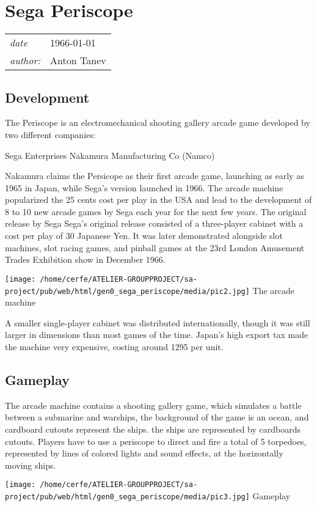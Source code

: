 \documentclass[a4paper,10pt]{book}
\newcommand{\pageHeader}[4]{
    \section{#1}
    \vspace{-0.3cm}
    \begin{table}[h!]
     \begin{tabular}{ll}
        \hline
        \textit{date} & #2 \\
        \textit{author: } & #3\\
        \hline
     \end{tabular}
    \end{table}
    \vspace{-0.3cm}
}
\begin{document}
 \newpage\pageHeader{Sega Periscope}{1966-01-01}{Anton Tanev}{A shooting gallery game, simutlating a submarine attacking warships}
 \subsection{Development }
 
        The Periscope is an electromechanical shooting gallery arcade game developed by two different companies:
         
 Sega Enterprises 
 Nakamura Manufacturing Co (Namco) 
 
        Nakamura claims the Persicope as their first arcade game, launching as early as 1965 in Japan, while Sega's version launched
        in 1966. The arcade machine popularized the 25 cents cost per play in the USA and lead to the development of 8 to 10 new arcade
        games by Sega each year for the next few years.  The original release by Sega Sega's original release  consisted of a three-player cabinet with a cost
        per play of 30 Japanese Yen. It was later demonstrated alongside slot machines, slot racing games, and pinball games at the
        23rd London Amusement Trades Exhibition show in December 1966.
         
 
 
 \texttt{[image: /home/cerfe/ATELIER-GROUPPROJECT/sa-project/pub/web/html/gen0\_sega\_periscope/media/pic2.jpg]}
 The arcade machine 
 
 
        A smaller single-player cabinet was distributed internationally, though it was still larger in dimensions than most games of the
        time. Japan's high export tax made the machine very expensive, costing around 1295 per unit.
         \subsection{Gameplay }
 
        The arcade machine contains a shooting gallery game, which simulates a battle between a submarine and warships, the background of the game
        is an ocean, and cardboard cutouts represent the ships.  the ships are represented by cardboards cutouts.  Players have to use a periscope to direct and fire a total of 5 torpedoes, represented
        by lines of colored lights and sound effects, at the horizontally moving ships.
         
 
 
 \texttt{[image: /home/cerfe/ATELIER-GROUPPROJECT/sa-project/pub/web/html/gen0\_sega\_periscope/media/pic3.jpg]}
 Gameplay 
 
\end{document}
